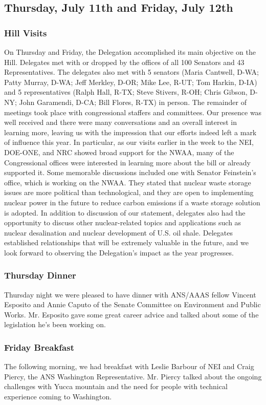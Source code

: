 \subsection*{Thursday, July 11th and Friday, July 12th}

\subsubsection*{Hill Visits}

On Thursday and Friday, the Delegation accomplished its main objective on the
Hill. Delegates met with or dropped by the offices of all 100 Senators and 43
Representatives. The delegates also met with 5 senators (Maria Cantwell, D-WA;
Patty Murray, D-WA; Jeff Merkley, D-OR; Mike Lee, R-UT; Tom Harkin, D-IA) and 5
representatives (Ralph Hall, R-TX; Steve Stivers, R-OH; Chris Gibson, D-NY; John
Garamendi, D-CA; Bill Flores, R-TX) in person. The remainder of meetings took
place with congressional staffers and committees. Our presence was well received
and there were many conversations and an overall interest in learning more,
leaving us with the impression that our efforts indeed left a mark of influence
this year. In particular, as our visits earlier in the week to the NEI, DOE-ONE,
and NRC showed broad support for the NWAA, many of the Congressional offices
were interested in learning more about the bill or already supported it. Some
memorable discussions included one with Senator Feinstein’s office, which is
working on the NWAA. They stated that nuclear waste storage issues are more
political than technological, and they are open to implementing nuclear power in
the future to reduce carbon emissions if a waste storage solution is adopted. In
addition to discussion of our statement, delegates also had the opportunity to
discuss other nuclear-related topics and applications such as nuclear
desalination and nuclear development of U.S. oil shale. Delegates established
relationships that will be extremely valuable in the future, and we look forward
to observing the Delegation’s impact as the year progresses.

\subsubsection*{Thursday Dinner}

Thursday night we were pleased to have dinner with ANS/AAAS fellow Vincent
Esposito and Annie Caputo of the Senate Committee on Environment and Public
Works. Mr. Esposito gave some great career advice and talked about some of the
legislation he’s been working on.  

\subsubsection*{Friday Breakfast}

The following morning, we had breakfast with Leslie Barbour of NEI and Craig
Piercy, the ANS Washington Representative. Mr. Piercy talked about the ongoing
challenges with Yucca mountain and the need for people with technical experience
coming to Washington.
